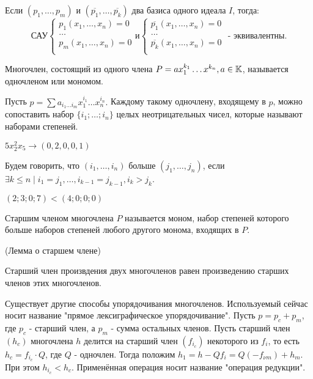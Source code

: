 \utv Если $(p_1,\ldots,p_m)$ и $(\overline{p_1},\ldots,\overline{p_k})$ два базиса одного идеала $I$, тогда:
\begin{equation*}
	\text{САУ}
	\begin{cases}
	   	p_1(x_1,\ldots,x_n) = 0\\
		\ldots\\
	   	p_m(x_1,\ldots,x_n) = 0\\
	\end{cases}
\text{и}
	\begin{cases}
	   	\overline{p_1}(x_1,\ldots,x_n) = 0\\
		\ldots\\
	   	\overline{p_k}(x_1,\ldots,x_n) = 0\\
	\end{cases}
\text{ - эквивалентны.}
\end{equation*}

\opr Многочлен, состоящий из одного члена $P = ax_1^{k_1}\ldots x^{k_n}, a \in \mathbb{K}$, называется одночленом или мономом.

Пусть $p = \sum a_{i_1 \ldots i_m}x_1^{i_1}\ldots x_n^{i_n}.$ Каждому такому одночлену, входящему в $p$, можно сопоставить набор $\{i_1;\ldots;i_n\}$  целых неотрицательных чисел, которые называют наборами степеней.

\example $5x_2^2x_5 \rightarrow (0,2,0,0,1)$

\opr Будем говорить, что $(i_1,\ldots,i_n)$ больше $(j_1,\ldots,j_n)$, если $\exists k \le n \mid i_1 = j_1, \ldots, i_{k-1} = j_{k-1},i_k > j_k$.

\example $(2;3;0;7) < (4;0;0;0)$

\opr Старшим членом многочлена $P$ называется моном, набор степеней которого больше наборов степеней любого другого монома, входящих в $P$.

\lem (Лемма о старшем члене)

Старший член произвдения двух многочленов равен произведению старших членов этих многочленов.

\note Существует другие способы упорядочивания многочленов. Используемый сейчас носит название "прямое лексиграфическое упорядочивание". Пусть $p = p_c + p_m$, где $p_c$ - старший член, а  $p_m$ - сумма остальных членов. Пусть старший член $(h_c)$ многочлена $h$ делится на старший член $(f_{i_c})$ некоторого из $f_i$, то есть $h_c = f_{i_c} \cdot Q$, где $Q$ - одночлен. Тогда положим $h_1 = h - Qf_i = Q(-f_{\nu m}) + h_m$. При этом $h_{i_c} < h_c$. Применённая операция носит название "операция редукции".

